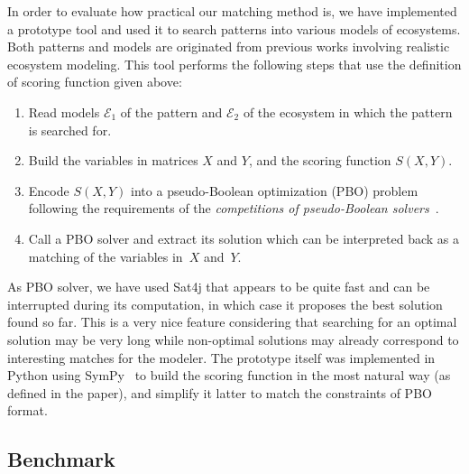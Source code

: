 \documentclass[a4paper,twoside]{article}
\begin{document}
In order to evaluate how practical our matching method is, we have implemented a prototype tool and used it to search patterns into various models of ecosystems.
Both patterns and models are originated from previous works involving  realistic ecosystem modeling.
This tool performs the following steps that use the definition of scoring function given above:
%
\begin{enumerate}
\item Read  models $\mathcal{E}_1$ of the pattern and
  $\mathcal{E}_2$ of the ecosystem in which the pattern is searched for.
\item Build the variables in matrices $X$ and $Y$, and the scoring function
  $S(X,Y)$.
\item Encode $S(X,Y)$ into a pseudo-Boolean optimization (PBO) problem following the requirements of the \emph{competitions of pseudo-Boolean solvers}~\cite{opb-format,pb16}.
\item Call a PBO solver and extract its solution which can be interpreted back as a matching of the variables in~$X$ and~$Y$.
\end{enumerate}
%
As  PBO solver, we have used Sat4j that appears to be quite fast and can be interrupted during its computation, in which case it proposes the best solution found so far.
This is a very nice feature considering that searching for an optimal solution may be very long while non-optimal solutions may already correspond to interesting matches for the modeler.
The prototype itself was implemented in Python using SymPy~\cite{sympy} to build the scoring function in the most natural way (\ie as defined in the paper), and simplify it latter to match the constraints of PBO format.

\subsection{Benchmark}
\end{document}

